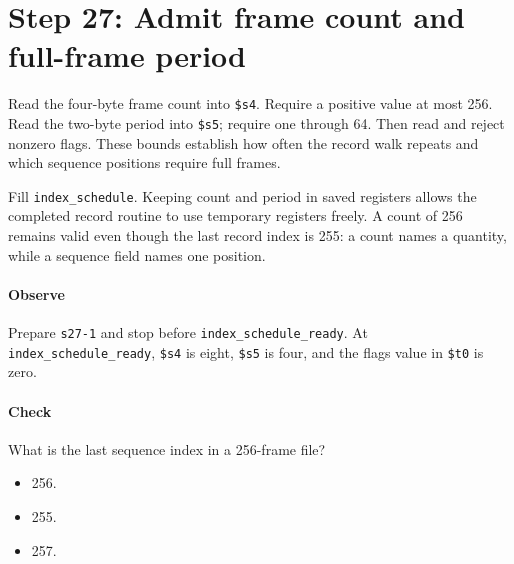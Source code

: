 \section{Step 27: Admit frame count and full-frame period}
Read the four-byte frame count into \texttt{\$s4}. Require a positive value
at most 256. Read the two-byte period into \texttt{\$s5}; require one through
64. Then read and reject nonzero flags. These bounds establish how often the
record walk repeats and which sequence positions require full frames.

Fill \texttt{index\_schedule}. Keeping count and period in saved registers
allows the completed record routine to use temporary registers freely. A count
of 256 remains valid even though the last record index is 255: a count names a
quantity, while a sequence field names one position.

\paragraph{Observe} Prepare \texttt{s27-1} and stop before
\texttt{index\_schedule\_ready}. At \texttt{index\_schedule\_ready}, \texttt{\$s4} is eight,
\texttt{\$s5} is four, and the flags value in \texttt{\$t0} is zero.

\paragraph{Check} What is the last sequence index in a 256-frame file?
\begin{itemize}
  \item[A.] 256.
  \item[B.] 255.
  \item[C.] 257.
\end{itemize}

